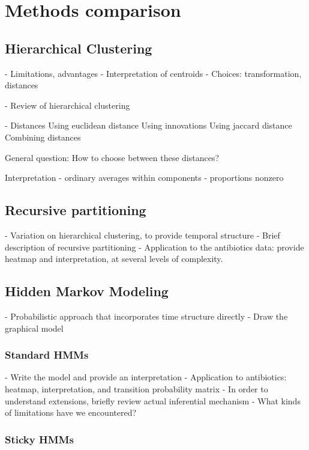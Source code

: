 \documentclass{report}
\begin{document}
\section{Methods comparison}

\subsection{Hierarchical Clustering}

- Limitations, advantages
- Interpretation of centroids
- Choices: transformation, distances

- Review of hierarchical clustering

- Distances
Using euclidean distance
Using innovations
Using jaccard distance
Combining distances

General question: How to choose between these distances?

Interpretation
- ordinary averages within components
- proportions nonzero

\subsection{Recursive partitioning}

- Variation on hierarchical clustering, to provide temporal structure
- Brief description of recursive partitioning
- Application to the antibiotics data: provide heatmap and interpretation, at
several levels of complexity.

\subsection{Hidden Markov Modeling}

- Probabilistic approach that incorporates time structure directly
- Draw the graphical model

\subsubsection{Standard HMMs}

- Write the model and provide an interpretation
- Application to antibiotics: heatmap, interpretation, and transition
probability matrix
- In order to understand extensions, briefly review actual inferential mechanism
- What kinds of limitations have we encountered?

\subsubsection{Sticky HMMs}
\end{document}
